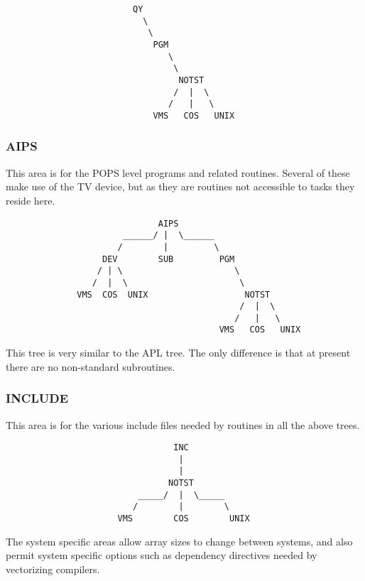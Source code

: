 \begin{verbatim}
                         QY
                           \
                            \
                             PGM
                                \
                                 \
                                  NOTST
                                 /  |  \
                                /   |   \
                             VMS   COS   UNIX
\end{verbatim}

\subsubsection{ AIPS }

This area is for the POPS level programs and related routines. Several of
these make use of the TV device, but as they are routines not accessible
to tasks they reside here.

\begin{verbatim}
                              AIPS
                       ______/ |  \______
                      /        |         \
                   DEV        SUB         PGM
                  / | \                      \
                 /  |  \                      \
              VMS  COS  UNIX                   NOTST
                                              /  |  \
                                             /   |   \
                                          VMS   COS   UNIX
\end{verbatim}

This tree is very similar to the APL tree. The only difference is that at
present there are no non-standard subroutines.

\subsubsection{ INCLUDE }

This area is for the various include files needed by routines in all the
above trees.

\begin{verbatim}
                                 INC
                                  |
                                  |
                                NOTST
                          _____/  |  \_____
                         /        |        \
                      VMS        COS        UNIX
\end{verbatim}

The system specific areas allow array sizes to change between systems,
and also permit system specific options such as dependency directives
needed by vectorizing compilers.


